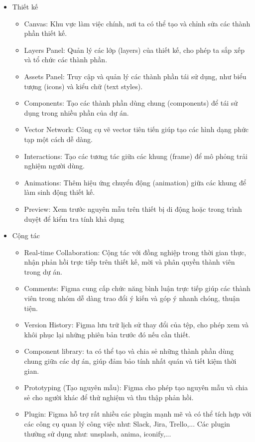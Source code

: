 \documentclass[11pt]{article}
\begin{document}
\begin{itemize}
    \item Thiết kế
          \begin{itemize}
              \item Canvas: Khu vực làm việc chính, nơi ta có thể tạo và chỉnh sửa các thành phần thiết kế.
              \item Layers Panel: Quản lý các lớp (layers) của thiết kế, cho phép ta sắp xếp và tổ chức các thành phần.
              \item Assets Panel: Truy cập và quản lý các thành phần tái sử dụng, như biểu tượng (icons) và kiểu chữ (text styles).
              \item Components: Tạo các thành phần dùng chung (components) để tái sử dụng trong nhiều phần của dự án.
              \item Vector Network: Công cụ vẽ vector tiên tiến giúp tạo các hình dạng phức tạp một cách dễ dàng.
              \item Interactions: Tạo các tương tác giữa các khung (frame) để mô phỏng trải nghiệm người dùng.
              \item Animations: Thêm hiệu ứng chuyển động (animation) giữa các khung để làm sinh động thiết kế.
              \item Preview: Xem trước nguyên mẫu trên thiết bị di động hoặc trong trình duyệt để kiểm tra tính khả dụng
          \end{itemize}

    \item Cộng tác
          \begin{itemize}
              \item Real-time Collaboration: Cộng tác với đồng nghiệp trong thời gian thực, nhận phản hồi trực tiếp trên thiết kế, mời và phân quyền thành viên trong dự án.
              \item Comments: Figma cung cấp chức năng bình luận trực tiếp giúp các thành viên trong nhóm dễ dàng trao đổi ý kiến và góp ý nhanh chóng, thuận tiện.
              \item Version History: Figma lưu trữ lịch sử thay đổi của tệp, cho phép xem và khôi phục lại những phiên bản trước đó nếu cần thiết.
              \item Component library: ta có thể tạo và chia sẻ những thành phần dùng chung giữa các dự án, giúp đảm bảo tính nhất quán và tiết kiệm thời gian.
              \item Prototyping (Tạo nguyên mẫu): Figma cho phép tạo nguyên mẫu và chia sẻ cho người khác để thử nghiệm và thu thập phản hồi.
              \item Plugin: Figma hỗ trợ rất nhiều các plugin mạnh mẽ và có thể tích hợp với các công cụ quan lý công việc như: Slack, Jira, Trello,... Các plugin thường sử dụng như: unsplash, anima, iconify,...
          \end{itemize}
\end{itemize}
\end{document}
